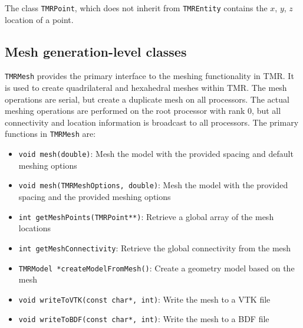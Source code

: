 \documentclass[12pt]{article}
\begin{document}
The class \texttt{TMRPoint}, which does not inherit from \texttt{TMREntity} contains the $x$, $y$, $z$ location of a point.

\subsection{Mesh generation-level classes}

\texttt{TMRMesh} provides the primary interface to the meshing functionality in TMR.
It is used to create quadrilateral and hexahedral meshes within TMR.
The mesh operations are serial, but create a duplicate mesh on all processors.
The actual meshing operations are performed on the root processor with rank 0, but all connectivity and location information is broadcast to all processors.
The primary functions in \texttt{TMRMesh} are:
\begin{itemize}
\item \texttt{void mesh(double)}: Mesh the model with the provided spacing and default meshing options
\item \texttt{void mesh(TMRMeshOptions, double)}: Mesh the model with the provided spacing and the provided meshing options
\item \texttt{int getMeshPoints(TMRPoint**)}: Retrieve a global array of the mesh locations
\item \texttt{int getMeshConnectivity}: Retrieve the global connectivity from the mesh
\item \texttt{TMRModel *createModelFromMesh()}: Create a geometry model based on the mesh
\item \texttt{void writeToVTK(const char*, int)}: Write the mesh to a VTK file
\item \texttt{void writeToBDF(const char*, int)}: Write the mesh to a BDF file
\end{itemize}
\end{document}

